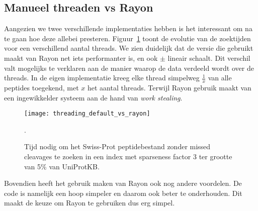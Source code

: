 \subsection{Manueel threaden vs Rayon}\label{subsec:manueel-threaden-vs-rayon}
Aangezien we twee verschillende implementaties hebben is het interessant om na te gaan hoe deze allebei presteren.
Figuur~\ref{fig:threading_default_vs_rayon} toont de evolutie van de zoektijden voor een verschillend aantal threads.
We zien duidelijk dat de versie die gebruikt maakt van Rayon net iets performanter is, en ook $\pm$ lineair schaalt.
Dit verschil valt mogelijks te verklaren aan de manier waarop de data verdeeld wordt over de threads.
In de eigen implementatie kreeg elke thread simpelweg $\frac{1}{x}$ van alle peptides toegekend, met $x$ het aantal threads.
Terwijl Rayon gebruik maakt van een ingewikkelder systeem aan de hand van \textit{work stealing}\cite{rayon_stealing}.

\begin{figure}[H]
    \centering
    \texttt{[image: threading\_default\_vs\_rayon]}
    \caption{Tijd nodig om het Swiss-Prot peptidebestand zonder missed cleavages te zoeken in een index met sparseness factor 3 ter grootte van 5\% van UniProtKB.}.
    \label{fig:threading_default_vs_rayon}
\end{figure}

Bovendien heeft het gebruik maken van Rayon ook nog andere voordelen.
De code is namelijk een hoop simpeler en daarom ook beter te onderhouden.
Dit maakt de keuze om Rayon te gebruiken dus erg simpel.